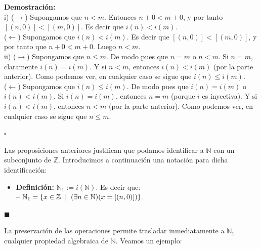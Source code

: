 \documentclass[10 pt]{article}
\begin{document}
\Large{\textbf{Demostración:} \\

i) ($\rightarrow$) Supongamos que $n<m$. Entonces $n+0<m+0$, y por tanto $[(n,0)]<[(m,0)]$. Es decir que $i(n)<i(m)$. \\

($\leftarrow$) Supongamos que $i(n)<i(m)$. Es decir que $[(n,0)]<[(m,0)]$, y por tanto que $n+0<m+0$. Luego $n<m$. \\

ii) ($\rightarrow$) Supongamos que $n \leq m$. De modo pues que $n=m$ o $n<m$. Si $n=m$, claramente $i(n)=i(m)$. Y si $n<m$, entonces $i(n)<i(m)$ (por la parte anterior). Como podemos ver, en cualquier caso se sigue que $i(n) \leq i(m)$. \\

($\leftarrow$) Supongamos que $i(n) \leq i(m)$. De modo pues que $i(n)=i(m)$ o $i(n)<i(m)$. Si $i(n)=i(m)$, entonces $n=m$ (porque $i$ es inyectiva). Y si $i(n)<i(m)$, entonces $n<m$ (por la parte anterior). Como podemos ver, en cualquier caso se sigue que $n \leq m$. } \\

\begin{flushright}
    $\square$
\end{flushright}

\Large{Las proposiciones anteriores justifican que podamos identificar a $\mathbb N$ con un subconjunto de $\mathbb Z$. Introducimos a continuación una notación para dicha identificación:} \\

\begin{itemize}
    \item \Large{\textbf{Definición:} $\mathbb N_1:=i(\mathbb N)$. Es decir que: \\

    -- $\mathbb N_1=\{x \in \mathbb Z \hspace{0.2 cm}|\hspace{0.2 cm}(\exists n \in \mathbb N)(x=[(n,0)])\}$.} \\
\end{itemize}

\begin{flushright}
    $\blacksquare$
\end{flushright}

\Large{La preservación de las operaciones permite trasladar inmediatamente a $\mathbb N_1$ cualquier propiedad algebraica de $\mathbb N$. Veamos un ejemplo:} \\
\end{document}
